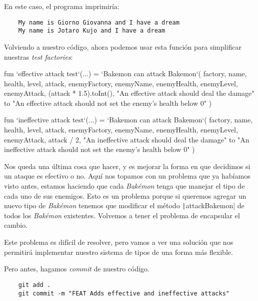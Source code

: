 
  En este caso, el programa imprimiría:

  \begin{verbatim}
    My name is Giorno Giovanna and I have a dream
    My name is Jotaro Kujo and I have a dream
  \end{verbatim}

  Volviendo a nuestro código, ahora podemos usar esta función para simplificar nuestras
  \textit{test factories}:

  \begin{kotlin}
    fun `effective attack test`(...) = `Bakemon can attack Bakemon`(
      factory, name, health, level, attack,
      enemyFactory, enemyName, enemyHealth, enemyLevel, enemyAttack,
      (attack * 1.5).toInt(),
      "An effective attack should deal the damage" to
          "An effective attack should not set the enemy's health below 0"
    )
  \end{kotlin}

  \begin{kotlin}
    fun `ineffective attack test`(...) = `Bakemon can attack Bakemon`(
      factory, name, health, level, attack,
      enemyFactory, enemyName, enemyHealth, enemyLevel, enemyAttack,
      attack / 2,
      "An ineffective attack should deal the damage" to
          "An ineffective attack should not set the enemy's health below 0"
    )
  \end{kotlin}

  Nos queda una última cosa que hacer, y es mejorar la forma en que decidimos si un ataque es
  efectivo o no.
  Aquí nos topamos con un problema que ya habíamos visto antes, estamos haciendo que cada 
  \textit{Bakémon} tenga que manejar el tipo de cada uno de sus enemigos.
  Esto es un problema porque si queremos agregar un nuevo tipo de \textit{Bakémon} tenemos que
  modificar el método \texttt|attackBakemon| de todos los \textit{Bakémon} existentes.
  Volvemos a tener el problema de encapsular el cambio.

  Este problema es difícil de resolver, pero vamos a ver una solución que nos permitirá
  implementar nuestro sistema de tipos de una forma más flexible.

  Pero antes, hagamos \textit{commit} de nuestro código.

  \begin{verbatim}
    git add .
    git commit -m "FEAT Adds effective and ineffective attacks"
  \end{verbatim}